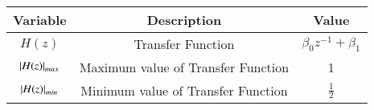 \begin{tabular}{|c|c|c|} 
      \hline
\textbf{Variable}& \textbf{Description}& \textbf{Value}\\\hline
	 $H(z)$ & Transfer Function & $\beta_0z^{-1} + \beta_1$ \\\hline
         $\left\vert H(z)\right\vert_{max}$ & Maximum value of Transfer Function & 1 \\\hline  
         $\left\vert H(z)\right\vert_{min}$ & Minimum value of Transfer Function & $\frac{1}{2}$\\\hline
    \end{tabular}
